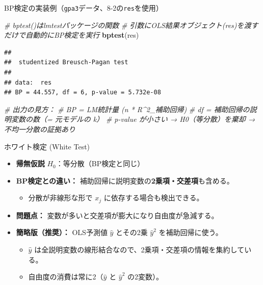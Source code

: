 \documentclass[
  ignorenonframetext,
]{beamer}
\newenvironment{Shaded}{\begin{snugshade}}{\end{snugshade}}
\newcommand{\CommentTok}[1]{\textcolor[rgb]{0.56,0.35,0.01}{\textit{#1}}}
\newcommand{\FunctionTok}[1]{\textcolor[rgb]{0.13,0.29,0.53}{\textbf{#1}}}
\newcommand{\NormalTok}[1]{#1}
\providecommand{\tightlist}{%
  \setlength{\itemsep}{0pt}\setlength{\parskip}{0pt}}
\begin{document}
\begin{frame}[fragile]{BP検定の実装例（\texttt{gpa3}データ、8-2の\texttt{res}を使用）}
\label{bpux691cux5b9aux306eux5b9fux88c5ux4f8bgpa3ux30c7ux30fcux30bf8-2ux306eresux3092ux4f7fux7528}
\footnotesize

\begin{Shaded}
\begin{Highlighting}[]
\CommentTok{\# bptest()はlmtestパッケージの関数}
\CommentTok{\# 引数にOLS結果オブジェクト(res)を渡すだけで自動的にBP検定を実行}
\FunctionTok{bptest}\NormalTok{(res)}
\end{Highlighting}
\end{Shaded}

\begin{verbatim}
## 
##  studentized Breusch-Pagan test
## 
## data:  res
## BP = 44.557, df = 6, p-value = 5.732e-08
\end{verbatim}

\begin{Shaded}
\begin{Highlighting}[]
\CommentTok{\# 出力の見方：}
\CommentTok{\#   BP = LM統計量 (n * R\^{}2\_補助回帰)}
\CommentTok{\#   df = 補助回帰の説明変数の数（= 元モデルの k）}
\CommentTok{\#   p{-}value が小さい → H0（等分散）を棄却 → 不均一分散の証拠あり}
\end{Highlighting}
\end{Shaded}

\normalsize
\end{frame}

\begin{frame}{ホワイト検定 (White Test)}
\label{ux30dbux30efux30a4ux30c8ux691cux5b9a-white-test}
\begin{itemize}
\tightlist
\item
  \textbf{帰無仮説} \(H_0\)：等分散（BP検定と同じ）
\item
  \textbf{BP検定との違い：}
  補助回帰に説明変数の\textbf{2乗項・交差項}も含める。

  \begin{itemize}
  \tightlist
  \item
    分散が非線形な形で \(x_j\) に依存する場合も検出できる。
  \end{itemize}
\item
  \textbf{問題点：} 変数が多いと交差項が膨大になり自由度が急減する。
\item
  \textbf{簡略版（推奨）：} OLS予測値 \(\hat{y}\) とその2乗
  \(\hat{y}^2\) を補助回帰に使う。

  \begin{itemize}
  \tightlist
  \item
    \(\hat{y}\)
    は全説明変数の線形結合なので、2乗項・交差項の情報を集約している。
  \item
    自由度の消費は常に2（\(\hat{y}\) と \(\hat{y}^2\) の2変数）。
  \end{itemize}
\end{itemize}
\end{frame}
\end{document}

